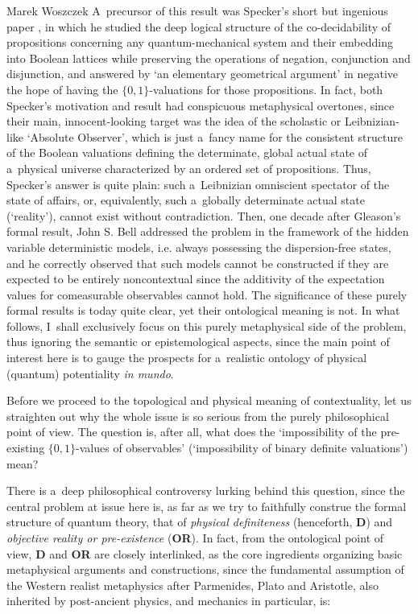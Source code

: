 \begin{artengenv}{Marek Woszczek}
A~precursor of this result was Specker's short but ingenious paper
\parencite[][]{specker_logik_1960}, %
 in which he studied the deep logical structure of the co-decidability of propositions concerning any quantum-mechanical system and their embedding into Boolean lattices while preserving the operations of negation, conjunction and disjunction, and answered by ‘an elementary geometrical argument' in negative the hope of having the $\{0,1\}${}-valuations for those propositions. In fact, both Specker's motivation and result had conspicuous metaphysical overtones, since their main, innocent-looking target was the idea of the scholastic or Leibnizian-like ‘Absolute Observer', which is just a~fancy name for the consistent structure of the Boolean valuations defining the determinate, global actual state of a~physical universe characterized by an ordered set of propositions. Thus, Specker's answer is quite plain: such a~Leibnizian omniscient spectator of the state of affairs, or, equivalently, such a~globally determinate actual state (‘reality'), cannot exist without contradiction. Then, one decade after Gleason's formal result, John S. Bell 
\parencite[][]{bell_problem_1966} %
 addressed the problem in the framework of the hidden variable deterministic models, i.e. always possessing the dispersion-free states, and he correctly observed that such models cannot be constructed if they are expected to be entirely noncontextual since the additivity of the expectation values for comeasurable observables cannot hold. The significance of these purely formal results is today quite clear, yet their ontological meaning is not. In what follows, I~shall exclusively focus on this purely metaphysical side of the problem, thus ignoring the semantic or epistemological aspects, since the main point of interest here is to gauge the prospects for a~realistic ontology of physical (quantum) potentiality \textit{in mundo}.

Before we proceed to the topological and physical meaning of contextuality, let us straighten out why the whole issue is so serious from the purely philosophical point of view. The question is, after all, what does the ‘impossibility of the pre-existing $\{0,1\}${}-values of observables' (‘impossibility of binary definite valuations') mean?

There is a~deep philosophical controversy lurking behind this question, since the central problem at issue here is, as far as we try to faithfully construe the formal structure of quantum theory, that of \textit{physical definiteness} (henceforth, \textbf{D}) and \textit{objective reality or pre-existence} (\textbf{OR}). In fact, from the ontological point of view, \textbf{D} and \textbf{OR} are closely interlinked, as the core ingredients organizing basic metaphysical arguments and constructions, since the fundamental assumption of the Western realist metaphysics after Parmenides, Plato and Aristotle, also inherited by post-ancient physics, and mechanics in particular, is:


\end{artengenv}
